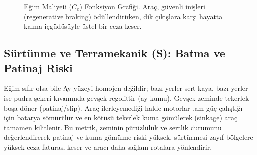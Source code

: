 \documentclass[12pt,a4paper]{article}
\begin{document}
\begin{figure}[h]
    \centering
    \caption{Eğim Maliyeti ($C_e$) Fonksiyon Grafiği. Araç, güvenli inişleri (regenerative braking) ödüllendirirken, dik çıkışlara karşı hayatta kalma içgüdüsüyle üstel bir ceza keser.}
    \label{fig:asimetrik_egri}
\end{figure}

\subsection{Sürtünme ve Terramekanik (S): Batma ve Patinaj Riski}
Eğim sıfır olsa bile Ay yüzeyi homojen değildir; bazı yerler sert kaya, bazı yerler ise pudra şekeri kıvamında gevşek regolittir (ay kumu). Gevşek zeminde tekerlek boşa döner (patinaj/slip). Araç ilerleyemediği halde motorlar tam güç çalıştığı için batarya sömürülür ve en kötüsü tekerlek kuma gömülerek (sinkage) araç tamamen kilitlenir. Bu metrik, zeminin pürüzlülük ve sertlik durumunu değerlendirerek patinaj ve kuma gömülme riski yüksek, sürtünmesi zayıf bölgelere yüksek ceza faturası keser ve aracı daha sağlam rotalara yönlendirir.
\end{document}
